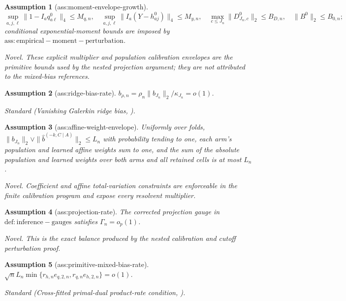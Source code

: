 \documentclass{article}
\newtheorem{assumption}{Assumption}
\begin{document}
\begin{assumption}[ass:moment-envelope-growth]\label{ass:moment-envelope-growth}
\[ \sup_{a,j,\ell}\|1-I_aq^0_{a\ell}\|_4\le M_{q,n},\quad \sup_{a,j,\ell}\|I_a(Y-h^0_{aj})\|_4\le M_{y,n},\quad \max_{c\le J_n}\|D^0_{J_n,c}\|_2\le B_{D,n},\quad \|B^0\|_2\le B_{0,n}; \] conditional exponential-moment bounds are imposed by \(\mathrm{ass:empirical-moment-perturbation}\).
\par\smallskip\noindent\emph{Novel.} These explicit multiplier and population calibration envelopes are the primitive bounds used by the nested projection argument; they are not attributed to the mixed-bias references.
\end{assumption}

\begin{assumption}[ass:ridge-bias-rate]\label{ass:ridge-bias-rate}
\(b_{\rho,n}=\rho_n\|b_{J_n}\|_2/\kappa_{J_n}=o(1)\).
\par\smallskip\noindent\emph{Standard} (Vanishing Galerkin ridge bias, \cite{AiChen2012SequentialMoments}).
\end{assumption}

\begin{assumption}[ass:affine-weight-envelope]\label{ass:affine-weight-envelope}
Uniformly over folds, \(\|b_{J_n}\|_2\vee\|\widehat b^{(-k,C\mid A)}\|_2\le L_n\) with probability tending to one, each arm's population and learned affine weights sum to one, and the sum of the absolute population and learned weights over both arms and all retained cells is at most \(L_n\).
\par\smallskip\noindent\emph{Novel.} Coefficient and affine total-variation constraints are enforceable in the finite calibration program and expose every resolvent multiplier.
\end{assumption}

\begin{assumption}[ass:projection-rate]\label{ass:projection-rate}
The corrected projection gauge in \(\mathrm{def:inference-gauges}\) satisfies \(\Gamma_n=o_p(1)\).
\par\smallskip\noindent\emph{Novel.} This is the exact balance produced by the nested calibration and cutoff perturbation proof.
\end{assumption}

\begin{assumption}[ass:primitive-mixed-bias-rate]\label{ass:primitive-mixed-bias-rate}
\(\sqrt nL_n\min\{r_{h,n}e_{q,2,n},r_{q,n}e_{h,2,n}\}=o(1)\).
\par\smallskip\noindent\emph{Standard} (Cross-fitted primal-dual product-rate condition, \cite{BennettEtAl2023SourceConditionDR}).
\end{assumption}
\end{document}
